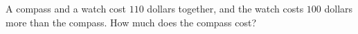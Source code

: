 A compass and a watch cost $110$ dollars together, and the watch costs $100$ dollars more than the compass. How much does the compass cost?
